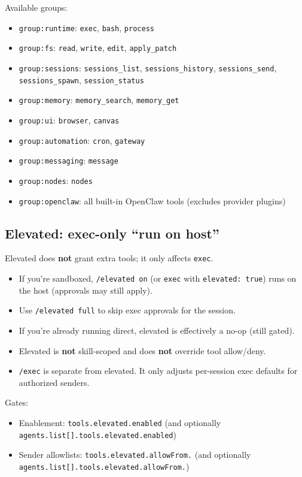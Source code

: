 Available groups:

\begin{itemize}
  \item \texttt{group:runtime}: \texttt{exec}, \texttt{bash}, \texttt{process}
  \item \texttt{group:fs}: \texttt{read}, \texttt{write}, \texttt{edit}, \texttt{apply\_patch}
  \item \texttt{group:sessions}: \texttt{sessions\_list}, \texttt{sessions\_history}, \texttt{sessions\_send}, \texttt{sessions\_spawn}, \texttt{session\_status}
  \item \texttt{group:memory}: \texttt{memory\_search}, \texttt{memory\_get}
  \item \texttt{group:ui}: \texttt{browser}, \texttt{canvas}
  \item \texttt{group:automation}: \texttt{cron}, \texttt{gateway}
  \item \texttt{group:messaging}: \texttt{message}
  \item \texttt{group:nodes}: \texttt{nodes}
  \item \texttt{group:openclaw}: all built-in OpenClaw tools (excludes provider plugins)
\end{itemize}


\subsection{Elevated: exec-only “run on host”}


Elevated does \textbf{not} grant extra tools; it only affects \texttt{exec}.

\begin{itemize}
  \item If you’re sandboxed, \texttt{/elevated on} (or \texttt{exec} with \texttt{elevated: true}) runs on the host (approvals may still apply).
  \item Use \texttt{/elevated full} to skip exec approvals for the session.
  \item If you’re already running direct, elevated is effectively a no-op (still gated).
  \item Elevated is \textbf{not} skill-scoped and does \textbf{not} override tool allow/deny.
  \item \texttt{/exec} is separate from elevated. It only adjusts per-session exec defaults for authorized senders.
\end{itemize}


Gates:

\begin{itemize}
  \item Enablement: \texttt{tools.elevated.enabled} (and optionally \texttt{agents.list[].tools.elevated.enabled})
  \item Sender allowlists: \texttt{tools.elevated.allowFrom.} (and optionally \texttt{agents.list[].tools.elevated.allowFrom.})
\end{itemize}


